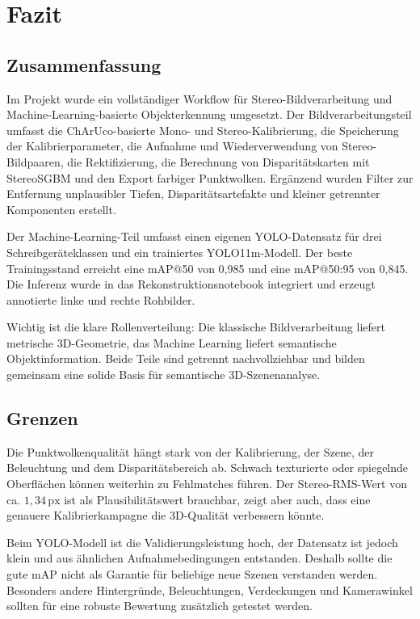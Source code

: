 \chapter{Fazit}

\section{Zusammenfassung}

Im Projekt wurde ein vollständiger Workflow für Stereo-Bildverarbeitung und
Machine-Learning-basierte Objekterkennung umgesetzt. Der Bildverarbeitungsteil umfasst die
ChArUco-basierte Mono- und Stereo-Kalibrierung, die Speicherung der Kalibrierparameter, die
Aufnahme und Wiederverwendung von Stereo-Bildpaaren, die Rektifizierung, die Berechnung von
Disparitätskarten mit StereoSGBM und den Export farbiger Punktwolken. Ergänzend wurden
Filter zur Entfernung unplausibler Tiefen, Disparitätsartefakte und kleiner getrennter
Komponenten erstellt.

Der Machine-Learning-Teil umfasst einen eigenen YOLO-Datensatz für drei Schreibgeräteklassen
und ein trainiertes YOLO11m-Modell. Der beste Trainingsstand erreicht eine mAP@50 von 0,985
und eine mAP@50:95 von 0,845. Die Inferenz wurde in das Rekonstruktionsnotebook integriert
und erzeugt annotierte linke und rechte Rohbilder.

Wichtig ist die klare Rollenverteilung: Die klassische Bildverarbeitung liefert metrische
3D-Geometrie, das Machine Learning liefert semantische Objektinformation. Beide Teile sind
getrennt nachvollziehbar und bilden gemeinsam eine solide Basis für semantische
3D-Szenenanalyse.

\section{Grenzen}

Die Punktwolkenqualität hängt stark von der Kalibrierung, der Szene, der Beleuchtung und dem
Disparitätsbereich ab. Schwach texturierte oder spiegelnde Oberflächen können weiterhin zu
Fehlmatches führen. Der Stereo-RMS-Wert von ca. $1{,}34\,\mathrm{px}$ ist als
Plausibilitätswert brauchbar, zeigt aber auch, dass eine genauere Kalibrierkampagne die
3D-Qualität verbessern könnte.

Beim YOLO-Modell ist die Validierungsleistung hoch, der Datensatz ist jedoch klein und aus
ähnlichen Aufnahmebedingungen entstanden. Deshalb sollte die gute mAP nicht als Garantie für
beliebige neue Szenen verstanden werden. Besonders andere Hintergründe, Beleuchtungen,
Verdeckungen und Kamerawinkel sollten für eine robuste Bewertung zusätzlich getestet werden.

